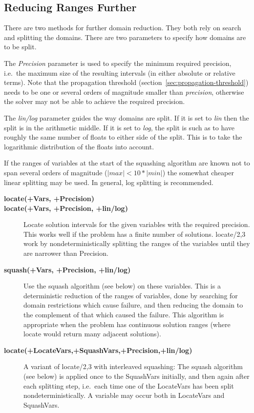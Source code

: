 \subsection{Reducing Ranges Further}
\label{sec:real-solving}
There are two methods for further domain reduction. They both rely on
search and splitting the domains. There are two parameters to specify how
domains are to be split.

The {\em Precision}  parameter is used to specify the
minimum required precision, i.e.\ the maximum size of the resulting
intervals (in either absolute or relative terms).
Note that the propagation threshold
(section~\ref{sec:propagation-threshold}) needs to be one or several orders
of magnitude smaller than {\em precision}, otherwise the solver may not be
able to achieve the required precision.

The {\em lin/log}  parameter guides the way domains are split.
If it is set to {\em lin} then the split is in the arithmetic middle.
If it is set to {\em log}, the split is such as to have roughly the
same number of floats to either side of the split. This is to take
the logarithmic distribution of the floats into account.

If the ranges of variables at the start of the squashing algorithm are
known not to span several orders of magnitude ($|max| < 10 * |min|$) the
somewhat cheaper linear splitting may be used. In general, log splitting
is recommended.

\begin{description}
\item[{\bf locate(+Vars, +Precision)}]
\item[{\bf locate(+Vars, +Precision, +lin/log)}]
Locate solution intervals for the given variables with the required
precision. This works well if the problem has a finite number of solutions.
locate/2,3 work by nondeterministically splitting the ranges of the variables
until they are narrower than Precision.

\item[{\bf squash(+Vars, +Precision, +lin/log)}]
Use the squash algorithm (see below) on these variables.
This is a deterministic reduction of the ranges of variables, done by
searching for domain restrictions which cause failure, and then reducing
the domain to the complement of that which caused the failure.
This algorithm is appropriate when the problem has continuous solution ranges
(where locate would return many adjacent solutions).

\item[{\bf locate(+LocateVars,+SquashVars,+Precision,+lin/log)}]
A variant of locate/2,3 with interleaved squashing:
The squash algorithm (see below)
is applied once to the SquashVars initially,
and then again after each splitting step,
i.e.\ each time one of the LocateVars has been split nondeterministically.
A variable may occur both in LocateVars and SquashVars.
\end{description}


